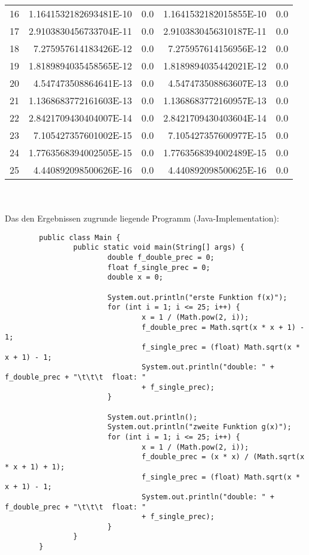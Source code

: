 \documentclass[a4paper,10pt]{article}
\begin{document}
\begin{compactenum}[a)]
\begin{tabular}{|c|r|r|r|r|}
			16	&	1.1641532182693481E-10	&	0.0	&	1.1641532182015855E-10	&	 0.0	\\
			17	&	2.9103830456733704E-11	&	0.0	&	2.9103830456310187E-11	&	 0.0	\\
			18	&	7.275957614183426E-12	&	0.0	&	7.275957614156956E-12	&	 0.0	\\
			19	&	1.8189894035458565E-12	&	0.0	&	1.8189894035442021E-12	&	 0.0	\\
			20	&	4.547473508864641E-13	&	0.0	&	4.547473508863607E-13	&	 0.0	\\
			21	&	1.1368683772161603E-13	&	0.0	&	1.1368683772160957E-13	&	 0.0	\\
			22	&	2.8421709430404007E-14	&	0.0	&	2.8421709430403604E-14	&	 0.0	\\
			23	&	7.105427357601002E-15	&	0.0	&	7.105427357600977E-15	&	 0.0	\\
			24	&	1.7763568394002505E-15	&	0.0	&	1.7763568394002489E-15	&	 0.0	\\
			25	&	4.440892098500626E-16	&	0.0	&	4.440892098500625E-16	&	 0.0	\\
			\hline 
		\end{tabular} \\\\
	Das den Ergebnissen zugrunde liegende Programm (Java-Implementation):
	\begin{verbatim}
		public class Main {
		        public static void main(String[] args) {
		                double f_double_prec = 0;
		                float f_single_prec = 0;
		                double x = 0;

		                System.out.println("erste Funktion f(x)");
		                for (int i = 1; i <= 25; i++) {
		                        x = 1 / (Math.pow(2, i));
		                        f_double_prec = Math.sqrt(x * x + 1) - 1;
		                        f_single_prec = (float) Math.sqrt(x * x + 1) - 1;
		                        System.out.println("double: " + f_double_prec + "\t\t\t  float: " 
		                        + f_single_prec);
		                }

		                System.out.println();
		                System.out.println("zweite Funktion g(x)");
		                for (int i = 1; i <= 25; i++) {
		                        x = 1 / (Math.pow(2, i));
		                        f_double_prec = (x * x) / (Math.sqrt(x * x + 1) + 1);
		                        f_single_prec = (float) Math.sqrt(x * x + 1) - 1;
		                        System.out.println("double: " + f_double_prec + "\t\t\t  float: " 
		                        + f_single_prec);
		                }
		        }
		}
	\end{verbatim}
	
	\end{compactenum}
\end{document}
